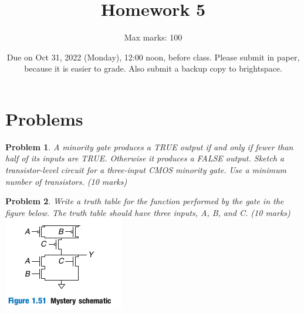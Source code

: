 \documentclass{article}
\title{Homework 5}
\author{Max marks: 100}
\date{Due on Oct 31, 2022 (Monday), 12:00 noon, before class. Please submit in paper,
because it is easier to grade. Also submit a backup copy to brightspace.}
\newtheorem{prob}{Problem}
\begin{document}
\maketitle

\section{Problems}

\begin{prob}
  A minority gate produces a TRUE output if and only if fewer than
  half of its inputs are TRUE. Otherwise it produces a FALSE output. Sketch a
  transistor-level circuit for a three-input CMOS minority gate. Use a minimum
  number of transistors. (10 marks)
\end{prob}
\begin{prob}
  Write a truth table for the function performed by the gate in
  the figure below. The truth table should have three inputs, A, B, and C. (10
  marks) \\
  \includegraphics[width=0.3\linewidth]{./fig/fig.1.51-mystery-schematic.png} 
\end{prob}
\end{document}
